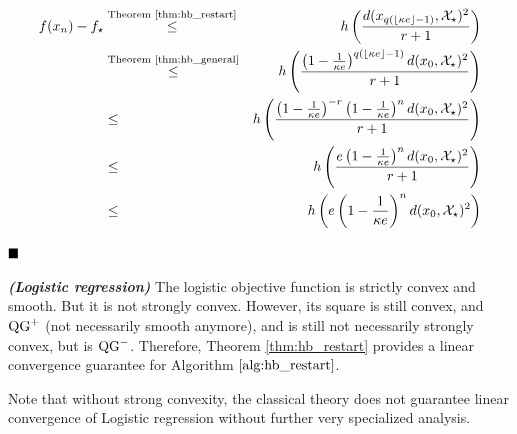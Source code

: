     \begin{eqnarray*}
         f(x_n) - f_\star & \overset{\text{Theorem \ref{thm:hb_restart}}}{\leq} & h\left(\frac{d(x_{q \left(\left\lfloor \kappa e \right\rfloor - 1\right)}, \mathcal{X}_\star)^2}{r+1} \right) \\
         & \overset{\text{Theorem \ref{thm:hb_general}}}{\leq} & h\left(\frac{\left(1 - \frac{1}{\kappa e}\right)^{q \left(\left\lfloor \kappa e \right\rfloor - 1\right)} d(x_0, \mathcal{X}_\star)^2}{r+1} \right) \\
         & \leq & h\left(\frac{\left(1 - \frac{1}{\kappa e}\right)^{-r} \left(1 - \frac{1}{\kappa e}\right)^{n} d(x_0, \mathcal{X}_\star)^2}{r+1} \right) \\
         & \leq & h\left(\frac{e \left(1 - \frac{1}{\kappa e}\right)^n d(x_0, \mathcal{X}_\star)^2}{r+1} \right) \\
         & \leq & h\left(e \left(1 - \frac{1}{\kappa e}\right)^n d(x_0, \mathcal{X}_\star)^2 \right)
    \end{eqnarray*}

$\hfill\blacksquare$

\begin{Ex}\textbf{\emph{(Logistic regression)}}
The logistic objective function is strictly convex and smooth.
But it is not strongly convex.
However, its square is still convex, and $\operatorname{QG}^+$ (not necessarily smooth anymore), and is still not necessarily strongly convex, but is $\operatorname{QG}^-$.
Therefore, Theorem \ref{thm:hb_restart} provides a linear convergence guarantee for Algorithm $\ref{alg:hb_restart}$.

Note that without strong convexity, the classical theory does not guarantee linear convergence of Logistic regression without further very specialized analysis.
\end{Ex}
